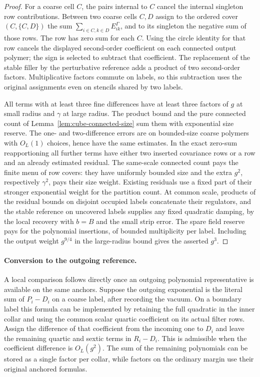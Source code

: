 \documentclass[11pt]{article}
\theoremstyle{definition}
\begin{document}
\begin{proof}
For a coarse cell \(C\), the pairs internal to \(C\) cancel
the internal singleton row contributions. Between two coarse
cells \(C,D\) assign to the ordered cover \((C,\{C,D\})\)
the sum \(\sum_{i\in C,k\in D}E^\Gamma_{ik}\), and to its
singleton the negative sum of those rows. The row has zero
sum for each \(C\). Using the circle identity for that row
cancels the displayed second-order coefficient on each
connected output polymer; the sign is selected to subtract
that coefficient. The replacement of the stable filler by
the perturbative reference adds a product of two second-order
factors. Multiplicative factors commute on labels, so this
subtraction uses the original assignments even on stencils
shared by two labels.

All terms with at least three fine differences have at least
three factors of \(g\) at small radius and \(\gamma\) at large
radius. The product bound and the pure connected count of
Lemma~\ref{lem:cube-connected-size} sum them with exponential
size reserve. The one- and two-difference errors are on
bounded-size coarse polymers with \(O_L(1)\) choices, hence
have the same estimates. In the exact zero-sum reapportioning
all further terms have either two inserted covariance rows
or a row and an already estimated residual. The same-scale
connected count pays the finite menu of row covers: they
have uniformly bounded size and the extra \(g^2\), respectively
\(\gamma^2\), pays their size weight. Existing residuals use
a fixed part of their stronger exponential weight for the
partition count. At common scale, products of the residual
bounds on disjoint occupied labels concatenate their
regulators, and the stable reference on uncovered labels
supplies any fixed quadratic damping, by the local recovery
with \(b=B\) and the small strip error. The spare field reserve
pays for the polynomial insertions, of bounded multiplicity
per label. Including the output weight \(g^{9/4}\) in the
large-radius bound gives the asserted \(g^3\).
\end{proof}

\paragraph{Conversion to the outgoing reference.}
A local comparison follows directly once an outgoing polynomial
representative is available on the same anchors. Suppose the
outgoing exponential is the literal sum of \(P_i-D_i\) on a
coarse label, after recording the vacuum. On a boundary label
this formula can be implemented by retaining the full quadratic
in the inner collar and using the common scalar quartic
coefficient on its actual filter rows. Assign the difference
of that coefficient from the incoming one to \(D_i\) and
leave the remaining quartic and sextic terms in \(R_i-D_i\).
This is admissible when the coefficient difference is
\(O_L(g^2)\). The sum of the remaining polynomials can be
stored as a single factor per collar, while factors on the
ordinary margin use their original anchored formulas.
\end{document}
